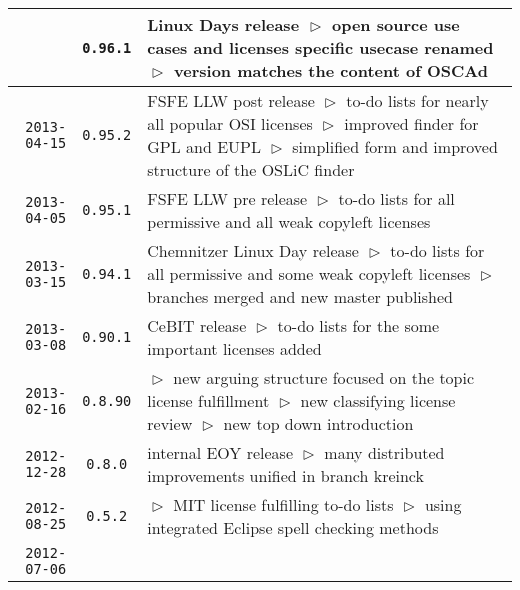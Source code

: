 \begin{table}
\begin{center}
\begin{tabular}{|r|c|p{9.4cm}|}
  & \texttt{0.96.1} 
  & Linux Days release\newline    
    $\vartriangleright$ open source use cases and licenses specific usecase renamed\newline
    $\vartriangleright$ version matches the content of OSCAd\\
\hline
    \texttt{2013-04-15}
  & \texttt{0.95.2} 
  & FSFE LLW post release\newline
    $\vartriangleright$ to-do lists for nearly all popular OSI licenses\newline
    $\vartriangleright$ improved finder for GPL and EUPL\newline
    $\vartriangleright$ simplified form and improved structure of the OSLiC finder\\
\hline
    \texttt{2013-04-05}
  & \texttt{0.95.1} 
  & FSFE LLW pre release\newline
    $\vartriangleright$ to-do lists for all permissive and all weak copyleft licenses\\
\hline
    \texttt{2013-03-15}
  & \texttt{0.94.1} 
  & Chemnitzer Linux Day release\newline
    $\vartriangleright$ to-do lists for all permissive and some weak copyleft licenses\newline
    $\vartriangleright$ branches merged and new master published\\
\hline
    \texttt{2013-03-08}
  & \texttt{0.90.1} 
  & CeBIT release\newline
    $\vartriangleright$ to-do lists for the some important licenses added\\
\hline
    \texttt{2013-02-16}
  & \texttt{0.8.90} 
  & $\vartriangleright$ new arguing structure focused on the topic license fulfillment\newline
    $\vartriangleright$ new classifying license review\newline   
    $\vartriangleright$ new top down introduction\\
\hline
    \texttt{2012-12-28}
  & \texttt{0.8.0} 
  & internal EOY release\newline
    $\vartriangleright$ many distributed improvements unified in branch kreinck\\
\hline
    \texttt{2012-08-25}
  & \texttt{0.5.2} 
  & $\vartriangleright$ MIT license fulfilling to-do lists\newline
    $\vartriangleright$ using integrated Eclipse spell checking methods\\
\hline
    \texttt{2012-07-06}

\end{tabular}
\end{center}
\end{table}
